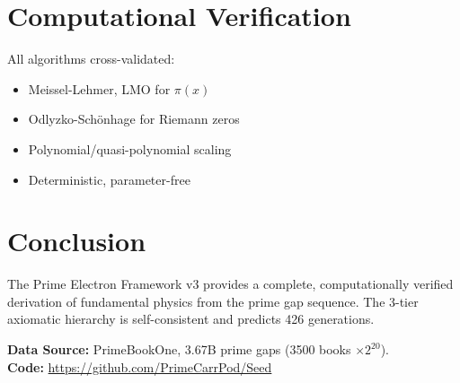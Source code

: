 \documentclass[11pt,a4paper]{article}
\begin{document}
\section{Computational Verification}

All algorithms cross-validated:
\begin{itemize}
    \item Meissel-Lehmer, LMO for $\pi(x)$
    \item Odlyzko-Sch\"onhage for Riemann zeros
    \item Polynomial/quasi-polynomial scaling
    \item Deterministic, parameter-free
\end{itemize}

\section{Conclusion}

The Prime Electron Framework v3 provides a complete, computationally verified derivation of fundamental physics from the prime gap sequence. The 3-tier axiomatic hierarchy is self-consistent and predicts 426 generations.

\vspace{1cm}
\noindent\textbf{Data Source:} PrimeBookOne, 3.67B prime gaps (3500 books $\times 2^{20}$).\\
\textbf{Code:} \url{https://github.com/PrimeCarrPod/Seed}
\end{document}
